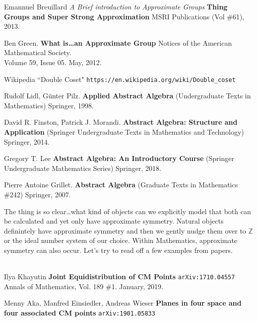 \documentclass[12pt]{article}
\begin{document}
\begin{thebibliography}{} 

\item Emannuel Breuillard \textit{A Brief introduction to Approximate Groups} 
\textbf{Thing Groups and Super Strong Approximation} MSRI Publications (Vol \#61), 2013. 

\item Ben Green. \textbf{What is\dots an Approximate Group} Notices of the American Mathematical Society. \\  Volume 59, Issue 05. May, 2012.

\item Wikipedia ``Double Coset" \texttt{https://en.wikipedia.org/wiki/Double\_{}coset} 

\item Rudolf Lidl, G\"{u}nter Pilz.  \textbf{Applied Abstract Algebra} (Undergraduate Texts in Mathematics) Springer, 1998.

\item David R. Finston, Patrick J. Morandi. \textbf{Abstract Algebra: Structure and Application} (Springer Undergraduate Texts in Mathematics and Technology) Springer, 2014.

\item Gregory T. Lee \textbf{Abstract Algebra: An Introductory Course} (Springer Undergraduate Mathematics Series) Springer, 2018.

\item Pierre Antoine Grillet. \textbf{Abstract Algebra} (Graduate Texts in Mathematics \#242) Springer, 2007.


\end{thebibliography}

\newpage

\noindent The thing is so clear\dots what kind of objects can we explicitly model that both can be calculated and yet only have approximate symmetry.  Natural objects definintely have approximate symmetry and then we gently nudge them over to $\mathbb{Z}$ or the ideal number system of our choice.  Within Mathematics, approximate symmetry can also occur. Let's try to read off a few examples from papers. \\ \\

\vfill 

\begin{thebibliography}{}

\item Ilya Khayutin \textbf{Joint Equidistribution of CM Points} \texttt{arXiv:1710.04557} \\
Annals of Mathematics,  Vol. 189 \#1.  January, 2019.

\item Menny Aka, Manfred Einsiedler, Andreas Wieser \textbf{Planes in four space and four associated CM points} \texttt{arXiv:1901.05833}

\end{thebibliography}
\end{document}
